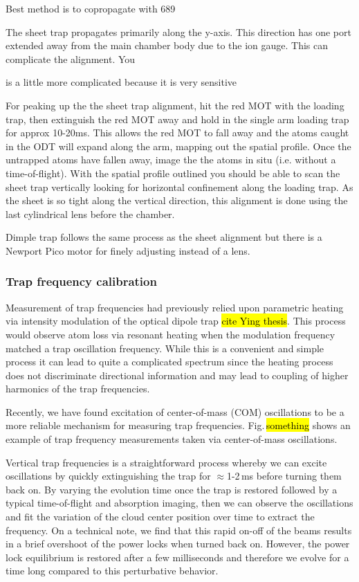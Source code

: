 
Best method is to copropagate with 689

The sheet trap propagates primarily along the y-axis. This direction has one port extended away from the main chamber body due to the ion gauge. This can complicate the alignment. You

is a little more complicated because it is very sensitive

For peaking up the the sheet trap alignment, hit the red MOT with the loading trap, then extinguish the red MOT away and hold in the single arm loading trap for approx 10-20ms. 
This allows the red MOT to fall away and the atoms caught in the ODT will expand along the arm, mapping out the spatial profile.
Once the untrapped atoms have fallen away, image the the atoms in situ (i.e. without a time-of-flight). 
With the spatial profile outlined you should be able to scan the sheet trap vertically looking for horizontal confinement along the loading trap. As the sheet is so tight along the vertical direction, this alignment is done using the last cylindrical lens before the chamber. 

Dimple trap follows the same process as the sheet alignment but there is a Newport Pico motor for finely adjusting instead of a lens.


\subsubsection{Trap frequency calibration} \label{sssec:1064_trap_freq}
Measurement of trap frequencies had previously relied upon parametric heating via intensity modulation of the optical dipole trap \hl{cite Ying thesis}. 
This process would observe atom loss via resonant heating when the modulation frequency matched a trap oscillation frequency. 
While this is a convenient and simple process it can lead to quite a complicated spectrum since the heating process does not discriminate directional information and may lead to coupling of higher harmonics of the trap frequencies. 

Recently, we have found excitation of center-of-mass (COM) oscillations to be a more reliable mechanism for measuring trap frequencies.
Fig.\,\hl{something} shows an example of trap frequency measurements taken via center-of-mass oscillations.

Vertical trap frequencies is a straightforward process whereby we can excite oscillations by quickly extinguishing the trap for $\approx$1-2\,ms before turning them back on.
By varying the evolution time once the trap is restored followed by a typical time-of-flight and absorption imaging, then we can observe the oscillations and fit the variation of the cloud center position over time to extract the frequency.
On a technical note, we find that this rapid on-off of the beams results in a brief overshoot of the power locks when turned back on.
However, the power lock equilibrium is restored after a few milliseconds and therefore we evolve for a time long compared to this perturbative behavior.

